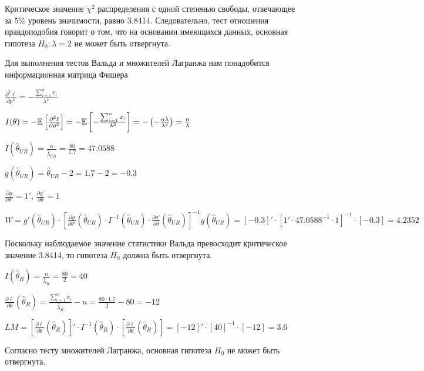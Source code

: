 \begin{problem}
\begin{sol}
Критическое значение $\chi^2$ распределения с одной степенью свободы, отвечающее за 5\% уровень значимости, равно 3.8414. Следовательно, тест отношения правдоподобия говорит о том, что на основании имеющихся данных, основная гипотеза $H_0: \lambda = 2$ не может быть отвергнута.

Для выполнения тестов Вальда и множителей Лагранжа нам понадобится информационная матрица Фишера

$\frac{\partial^2 \ell}{\partial p^2} = - \frac{\sum_{i=1}^n x_i}{\lambda^2}$

$I(\theta) = -\mathbb{E}\left[ \frac{\partial^2 \ell}{\partial p^2} \right] = -\mathbb{E} \left[ - \frac{\sum_{i=1}^n x_i}{\lambda^2} \right] = -\left(-\frac{n\lambda}{\lambda^2}\right) = \frac{n}{\lambda}$

$I(\hat{\theta}_{UR}) = \frac{n}{\hat{\lambda}_{UR}} = \frac{80}{1.7} = 47.0588$

$g(\hat{\theta}_{UR}) = \hat{\theta}_{UR} - 2 = 1.7 - 2 = -0.3$

$\frac{\partial g}{\partial \theta'} = 1'$, $\frac{\partial g'}{\partial \theta} = 1$

$W = g'(\hat{\theta}_{UR}) \cdot \left[ \frac{\partial g}{\partial \theta'}(\hat{\theta}_{UR}) \cdot I^{-1}(\hat{\theta}_{UR}) \cdot \frac{\partial g'}{\partial \theta}(\hat{\theta}_{UR}) \right]^{-1} g(\hat{\theta}_{UR}) = [-0.3]' \cdot [1' \cdot 47.0588^{-1} \cdot 1]^{-1} \cdot [-0.3] = 4.2352$

Поскольку наблюдаемое значение статистики Вальда превосходит критическое значение 3.8414, то гипотеза $H_0$ должна быть отвергнута.

$I(\hat{\theta}_{R}) = \frac{n}{\hat{\lambda}_{R}} = \frac{80}{2} = 40$

$\frac{\partial \ell}{\partial \theta}(\hat{\theta}_R) = \frac{\sum_{i=1}^n x_i}{\hat{\lambda}_R} - n = \frac{80 \cdot 1.7}{2} - 80 = -12$

$LM = \left[ \frac{\partial \ell}{\partial \theta}(\hat{\theta}_{R}) \right]' \cdot I^{-1}(\hat{\theta}_{R}) \cdot \left[ \frac{\partial \ell}{\partial \theta}(\hat{\theta}_{R}) \right] = [-12]' \cdot [40]^{-1} \cdot [-12] = 3.6$

Согласно тесту множителей Лагранжа, основная гипотеза $H_0$ не может быть отвергнута.
\end{sol}
\end{problem}




